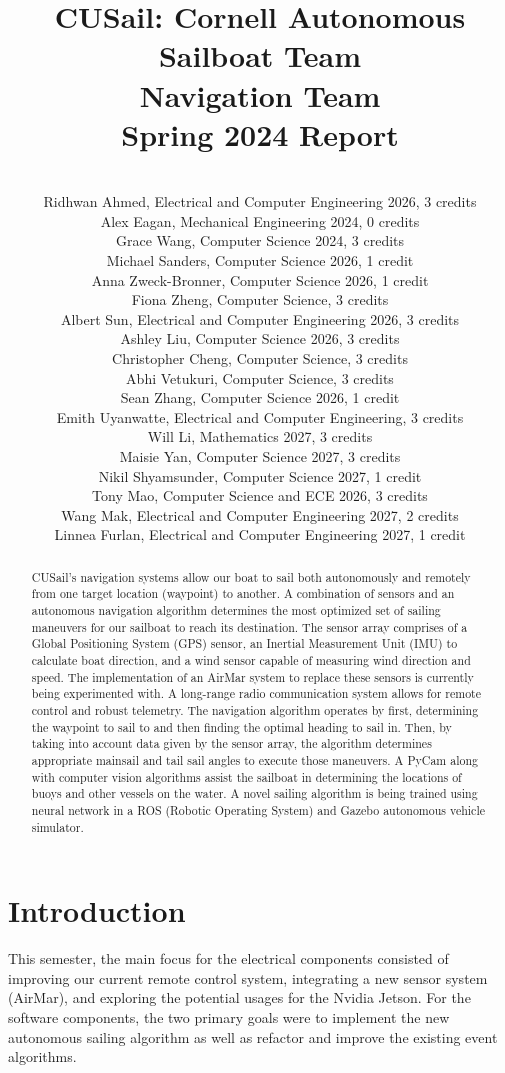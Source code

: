 \documentclass{article}
\title{CUSail: Cornell Autonomous Sailboat Team \\ \textbf{Navigation Team}\\ Spring 2024 Report}
\author{
\\ Ridhwan Ahmed, Electrical and Computer Engineering 2026, 3 credits
\\ Alex Eagan, Mechanical Engineering 2024, 0 credits
\\ Grace Wang, Computer Science 2024, 3 credits
\\ Michael Sanders, Computer Science 2026, 1 credit
\\ Anna Zweck-Bronner, Computer Science 2026, 1 credit
\\ Fiona Zheng, Computer Science, 3 credits
\\ Albert Sun, Electrical and Computer Engineering 2026, 3 credits
\\ Ashley Liu, Computer Science 2026, 3 credits
\\ Christopher Cheng, Computer Science, 3 credits
\\ Abhi Vetukuri, Computer Science, 3 credits
\\ Sean Zhang, Computer Science 2026, 1 credit
\\ Emith Uyanwatte, Electrical and Computer Engineering, 3 credits
\\ Will Li, Mathematics 2027, 3 credits
\\ Maisie Yan, Computer Science 2027, 3 credits
\\ Nikil Shyamsunder, Computer Science 2027, 1 credit
\\ Tony Mao, Computer Science and ECE 2026, 3 credits
\\ Wang Mak, Electrical and Computer Engineering 2027, 2 credits
\\ Linnea Furlan, Electrical and Computer Engineering 2027, 1 credit
}
\begin{document}
\maketitle
\clearpage
\begin{changemargin}{1.5cm}{1.5cm} 

\begin{abstract}
CUSail's navigation systems allow our boat to sail both autonomously and remotely from one target location (waypoint) to another. A combination of sensors and an autonomous navigation algorithm determines the most optimized set of sailing maneuvers for our sailboat to reach its destination. The sensor array comprises
of a Global Positioning System (GPS) sensor, an Inertial Measurement Unit (IMU) to calculate boat direction, and a wind sensor capable of measuring wind direction and speed. The implementation of an AirMar system to replace these sensors is currently being experimented with. A long-range radio communication system allows for remote control and robust telemetry. The navigation algorithm operates by first, determining the waypoint to sail to and then finding the optimal heading to sail in. Then, by taking into account data given by the sensor array, the algorithm determines appropriate mainsail and tail sail angles to execute those maneuvers. A PyCam along with computer vision algorithms assist the sailboat in determining the locations of buoys and other vessels on the water. A novel sailing algorithm is being trained using neural network in a ROS (Robotic Operating System) and Gazebo autonomous vehicle simulator. 

\end{abstract}
\clearpage
\tableofcontents
\end{changemargin}
\newpage

\twocolumn

\section{Introduction}
This semester, the main focus for the electrical components consisted of improving our current remote control system, integrating a new sensor system (AirMar), and exploring the potential usages for the Nvidia Jetson. For the software components, the two primary goals were to implement the new autonomous sailing algorithm as well as refactor and improve the existing event algorithms. 
\end{document}
